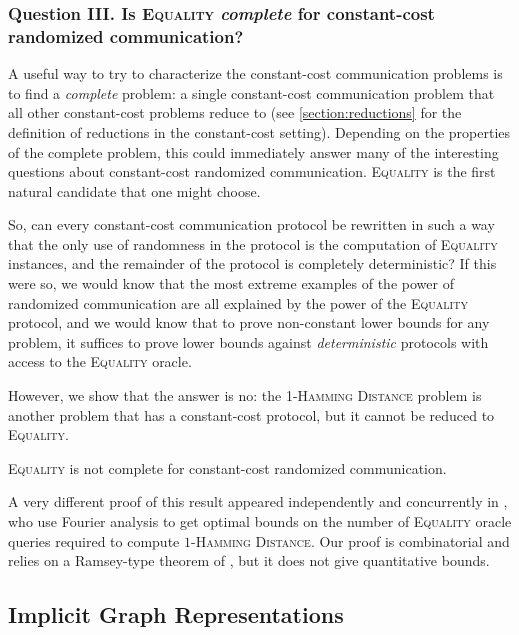 \documentclass{theoretics}
\begin{document}
\subsubsection*{Question III. Is \textsc{Equality} \emph{complete} for constant-cost randomized communication?}

A useful way to try to characterize the constant-cost communication problems is to find a
\emph{complete} problem: a single constant-cost communication problem that all other constant-cost
problems reduce to (see \cref{section:reductions} for the definition of reductions in the
constant-cost setting). Depending on the properties of the complete problem, this could immediately
answer many of the interesting questions about constant-cost randomized communication.
\textsc{Equality} is the first natural candidate that one might choose.

So, can every constant-cost communication protocol be rewritten in such a way that the only use of
randomness in the protocol is the computation of \textsc{Equality} instances, and the remainder of
the protocol is completely deterministic?  If this were so, we would know that the most extreme
examples of the power of randomized communication are all explained by the power of the
\textsc{Equality} protocol, and we would know that to prove non-constant lower bounds for any
problem, it suffices to prove lower bounds against \emph{deterministic} protocols with access to the
\textsc{Equality} oracle. 

However, we show that the answer is no: the \textsc{1-Hamming Distance} problem is another problem
that has a constant-cost protocol, but it cannot be reduced to \textsc{Equality}. 
\begin{theorem}
\textsc{Equality} is not complete for constant-cost randomized communication.
\end{theorem}
A very different proof of this result appeared independently and concurrently in
\cite{HHH23dimfree}, who use Fourier analysis to get optimal bounds on the number of
\textsc{Equality} oracle queries required to compute \textsc{$1$-Hamming Distance}.  Our proof is
combinatorial and relies on a Ramsey-type theorem of \cite{ARSV06}, but it does not give
quantitative
bounds.

\subsection{Implicit Graph Representations}
\label{section:intro-implicit}
\end{document}
